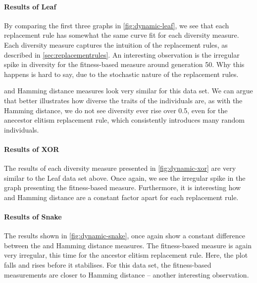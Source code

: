 \paragraph{Results of Leaf} By comparing the first three graphs in \cref{fig:dynamic-leaf}, we see that each replacement rule has somewhat the same curve fit for each diversity measure. Each diversity measure captures the intuition of the replacement rules, as described in \cref{sec:replacementrules}. An interesting observation is the irregular spike in diversity for the fitness-based measure around generation \num{50}. Why this happens is hard to say, due to the stochastic nature of the replacement rules.

\dia{} and Hamming distance measures look very similar for this data set. We can argue that \dia{} better illustrates how diverse the traits of the individuals are, as with the Hamming distance, we do not see diversity ever rise over \num{0.5}, even for the anecestor elitism replacement rule, which consistently introduces many random individuals. 



\paragraph{Results of XOR} The results of each diversity measure presented in \cref{fig:dynamic-xor} are very similar to the Leaf data set above. Once again, we see the irregular spike in the graph presenting the fitness-based measure. Furthermore, it is interesting how \dia{} and Hamming distance are a constant factor apart for each replacement rule.%



\paragraph{Results of Snake} The results shown in \cref{fig:dynamic-snake}, once again show a constant difference between the \dia{} and Hamming distance measures. The fitness-based measure is again very irregular, this time for the ancestor elitism replacement rule. Here, the plot falls and rises before it stabilises. For this data set, the fitness-based measurements are closer to Hamming distance -- another interesting observation.

